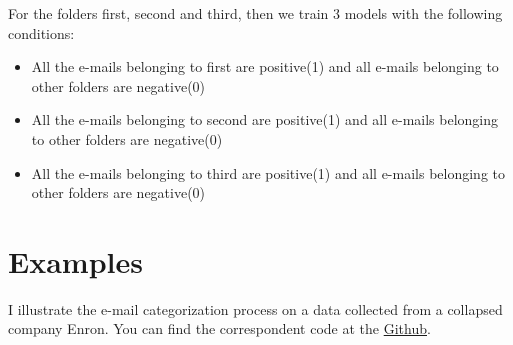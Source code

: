 \documentclass[11pt,fleqn]{book} %
\begin{document}
For the folders first, second and third, then we train 3 models with the following conditions:
\begin{itemize}
\item All the e-mails belonging to first are positive(1) and all e-mails belonging to other folders are negative(0)

\item All the e-mails belonging to second are positive(1) and all e-mails belonging to other folders are negative(0)

\item All the e-mails belonging to third are positive(1) and all e-mails belonging to other folders are negative(0)
\end{itemize}

\section{Examples}
I illustrate the e-mail categorization process on a data collected from a collapsed company Enron. You can find the correspondent code at the \href{https://github.com/sergeplatonov/Data_problems/tree/master/Email%20categorization}{Github}.
\end{document}
